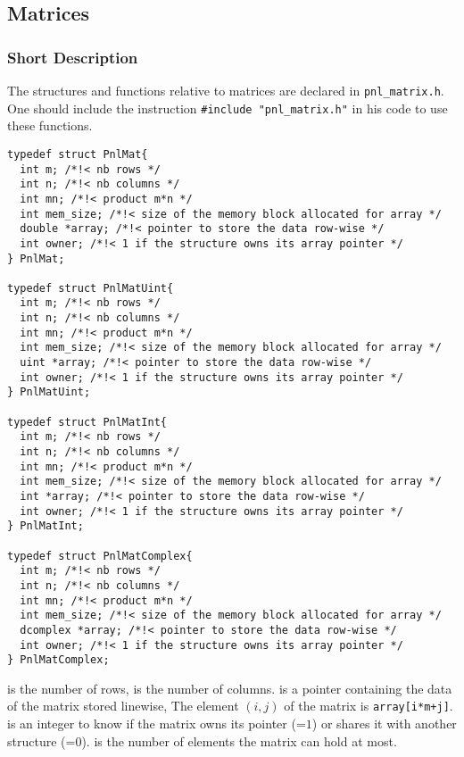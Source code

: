 
\subsection{Matrices}
\subsubsection{Short Description}

The structures and functions relative to matrices are declared in
\verb!pnl_matrix.h!. One should include the instruction
\verb!#include "pnl_matrix.h"! in his code to use these functions.

\begin{verbatim}
typedef struct PnlMat{
  int m; /*!< nb rows */ 
  int n; /*!< nb columns */ 
  int mn; /*!< product m*n */
  int mem_size; /*!< size of the memory block allocated for array */
  double *array; /*!< pointer to store the data row-wise */
  int owner; /*!< 1 if the structure owns its array pointer */
} PnlMat;

typedef struct PnlMatUint{
  int m; /*!< nb rows */ 
  int n; /*!< nb columns */ 
  int mn; /*!< product m*n */
  int mem_size; /*!< size of the memory block allocated for array */
  uint *array; /*!< pointer to store the data row-wise */
  int owner; /*!< 1 if the structure owns its array pointer */
} PnlMatUint;

typedef struct PnlMatInt{
  int m; /*!< nb rows */ 
  int n; /*!< nb columns */ 
  int mn; /*!< product m*n */
  int mem_size; /*!< size of the memory block allocated for array */
  int *array; /*!< pointer to store the data row-wise */
  int owner; /*!< 1 if the structure owns its array pointer */
} PnlMatInt;

typedef struct PnlMatComplex{
  int m; /*!< nb rows */ 
  int n; /*!< nb columns */ 
  int mn; /*!< product m*n */
  int mem_size; /*!< size of the memory block allocated for array */
  dcomplex *array; /*!< pointer to store the data row-wise */
  int owner; /*!< 1 if the structure owns its array pointer */
} PnlMatComplex;
\end{verbatim}
 is the number of rows,  is the number of columns. 
is a pointer containing the data of the matrix stored linewise, The element
$(i, j)$ of the matrix is \verb!array[i*m+j]!.  is an integer to
know if the matrix owns its  pointer (=$1$) or shares it
with another structure (=$0$).  is the number of
elements the matrix can hold at most.


